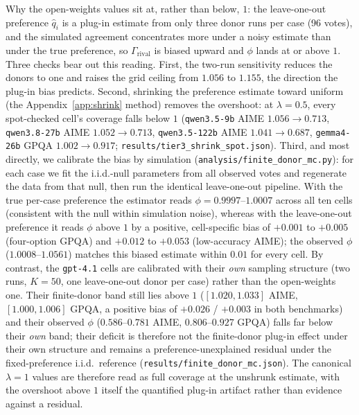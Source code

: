 \documentclass{article}
\newcommand{\agreementIndex}{\Gamma}
\begin{document}
Why the open-weights values sit at, rather than below, $1$: the
leave-one-out preference $\hat q_i$ is a plug-in estimate from only
three donor runs per case (96 votes), and the simulated agreement
concentrates more under a noisy estimate than under the true preference,
so $\agreementIndex_{\mathrm{rival}}$ is biased upward and $\phi$ lands at or
above $1$. Three checks bear out this reading. First, the two-run
sensitivity reduces the donors to one and raises the grid ceiling from
$1.056$ to $1.155$, the direction the plug-in bias predicts. Second,
shrinking the preference estimate toward uniform (the
Appendix~\ref{app:shrink} method) removes the overshoot: at
$\lambda=0.5$, every spot-checked cell's coverage falls below $1$
(\texttt{qwen3.5-9b} AIME $1.056\to0.713$,
\texttt{qwen3.8-27b} AIME $1.052\to0.713$,
\texttt{qwen3.5-122b} AIME $1.041\to0.687$,
\texttt{gemma4-26b} GPQA $1.002\to0.917$;
\texttt{results/tier3\_shrink\_spot.json}). Third, and most directly, we
calibrate the bias by simulation
(\texttt{analysis/finite\_donor\_mc.py}): for each case we fit the
i.i.d.-null parameters from all observed votes and regenerate the data
from that null, then run the identical leave-one-out pipeline. With the
true per-case preference the estimator reads
$\phi=0.9997$--$1.0007$ across all ten cells (consistent with the null
within simulation noise), whereas with the leave-one-out preference it reads
$\phi$ above $1$ by a positive, cell-specific bias of $+0.001$ to
$+0.005$ (four-option GPQA) and $+0.012$ to $+0.053$ (low-accuracy AIME);
the observed $\phi$ ($1.0008$--$1.0561$) matches this biased estimate
within $0.01$ for every cell. By contrast, the \texttt{gpt-4.1} cells are calibrated with their
\emph{own} sampling structure (two runs, $K=50$, one leave-one-out donor per
case) rather than the open-weights one. Their finite-donor band still lies
above $1$ ($[1.020,1.033]$ AIME, $[1.000,1.006]$ GPQA, a positive bias of
$+0.026$ / $+0.003$ in both benchmarks) and their observed
$\phi$ ($0.586$--$0.781$ AIME, $0.806$--$0.927$ GPQA) falls far
below their \emph{own} band; their deficit is therefore not the finite-donor
plug-in effect under their own structure and remains a preference-unexplained
residual under the fixed-preference i.i.d.\ reference
(\texttt{results/finite\_donor\_mc.json}). The canonical $\lambda=1$
values are therefore read as full coverage at the unshrunk
estimate, with the overshoot above $1$ itself the quantified plug-in
artifact rather than evidence against a residual.
\end{document}
